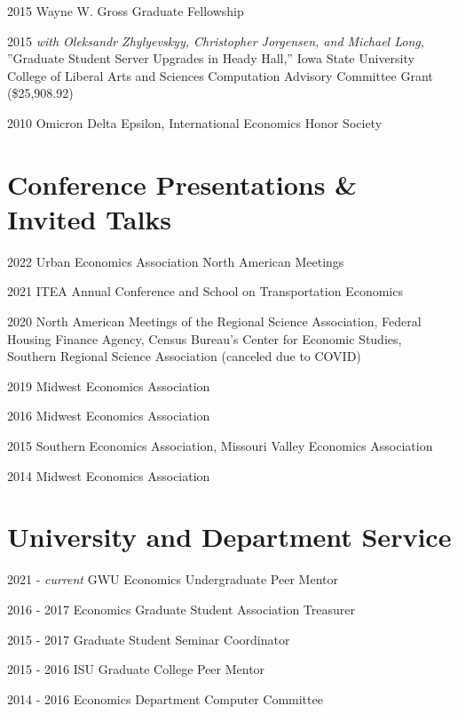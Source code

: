 \documentclass[letterpaper]{article}
\renewenvironment{itemize}{
  \begin{list}{}{
    \setlength{\leftmargin}{0em}
  }
}{
  \end{list}
}
\begin{document}
\begin{itemize}
\item 2015 Wayne W. Gross Graduate Fellowship
\item 2015 \textit{ with Oleksandr Zhylyevskyy, Christopher Jorgensen, and Michael Long}, ''Graduate Student Server Upgrades in Heady Hall,'' Iowa State University College of Liberal Arts and Sciences Computation Advisory Committee Grant (\$25,908.92)
  \item 2010 Omicron Delta Epsilon, International Economics Honor Society
\end{itemize}
\section*{Conference Presentations \& Invited Talks}


\begin{itemize}
\item 2022 Urban Economics Association North American Meetings
\item 2021 ITEA Annual Conference and School on Transportation Economics
\item 2020 North American Meetings of the Regional Science Association, Federal Housing Finance Agency, Census Bureau's Center for Economic Studies, Southern Regional Science Association (canceled due to COVID)
\item 2019 Midwest Economics Association
\item 2016 Midwest Economics Association
\item 2015 Southern Economics Association, Missouri Valley Economics Association
\item 2014 Midwest Economics Association
\end{itemize}

\section*{University and Department Service}

\begin{itemize}
\item 2021 - \textit{current} GWU Economics Undergraduate Peer Mentor
\item 2016 - 2017 Economics Graduate Student Association Treasurer
\item 2015 - 2017 Graduate Student Seminar Coordinator
\item 2015 - 2016 ISU Graduate College Peer Mentor
\item 2014 - 2016 Economics Department Computer Committee
\end{itemize}
\end{document}
